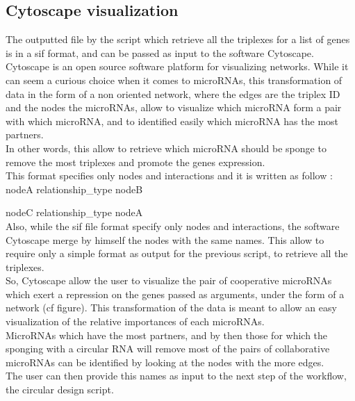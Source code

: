 \documentclass[a4paper,12pt]{report}
\begin{document}
\subsection{Cytoscape visualization}

The outputted file by the script which retrieve all the triplexes for a list of genes is in a sif format, and can be passed as input to the software Cytoscape\cite{cytoscape}.\\

Cytoscape is an open source software platform for visualizing networks. While it can seem a curious choice when it comes to microRNAs, this transformation of data in the form of a non oriented network, where the edges are the triplex ID and the nodes the microRNAs, allow to visualize which microRNA form a pair with which microRNA, and to identified easily which microRNA has the most partners.\\

In other words, this allow to retrieve which microRNA should be sponge to remove the most triplexes and promote the genes expression.\\

This format specifies only nodes and interactions and it is written as follow :\\


nodeA relationship\_type nodeB 

nodeC relationship\_type nodeA \\


Also, while the sif file format specify only nodes and interactions, the software Cytoscape merge by himself the nodes with the same names. This allow to require only a simple format as output for the previous script, to retrieve all the triplexes.\\

So, Cytoscape allow the user to visualize the pair of cooperative microRNAs which exert a repression on the genes passed as arguments, under the form of a network (cf figure). This transformation of the data is meant to allow an easy visualization of the relative importances of each microRNAs.\\

MicroRNAs which have the most partners, and by then those for which the sponging with a circular RNA will remove most of the pairs of collaborative microRNAs can be identified by looking at the nodes with the more edges.\\

The user can then provide this names as input to the next step of the workflow, the circular design script.\\
\end{document}

